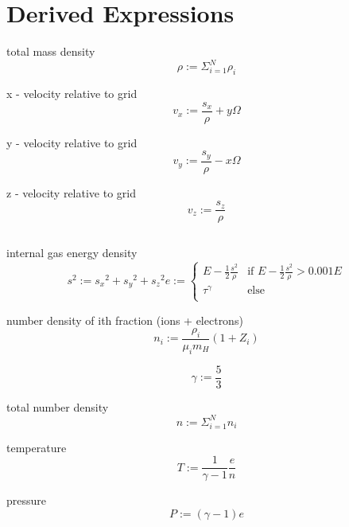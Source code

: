 \documentclass{article}
\begin{document}
\section{Derived Expressions}

total mass density
\begin{equation}
\rho := \Sigma_{i=1}^N \rho_i 
\end{equation}

x - velocity relative to grid
\begin{equation}
v_x  := \frac{s_x}{\rho} + y \Omega 
\end{equation}

y - velocity relative to grid
\begin{equation}
v_y  := \frac{s_y}{\rho} - x \Omega 
\end{equation}

z - velocity relative to grid
\begin{equation}
v_z  := \frac{s_z}{\rho} 
\end{equation}

\begin{equation}
\end{equation}

internal gas energy density
\begin{equation}
s^2  :=  {s_x}^2 + {s_y}^2 + {s_z}^2
e    :=  \begin{cases}
       E - \frac{1}{2} \frac{s^2}{\rho} & \text{if } E - \frac{1}{2} \frac{s^2}{\rho} > 0.001 E \\
       \tau^\gamma & \text{else} \\
     \end{cases} 
\end{equation}

number density of ith fraction (ions + electrons)
\begin{equation}
n_i := \frac{\rho_i}{\mu_i m_H} \left ( 1 + Z_i \right ) 
\end{equation}

\begin{equation}
\gamma := \frac{5}{3}
\end{equation}

total number density
\begin{equation}
n := \Sigma_{i=1}^N  n_i
\end{equation}

temperature
\begin{equation}
T := \frac{1}{\gamma-1} \frac{e}{n}
\end{equation}

pressure
\begin{equation}
P := \left(\gamma-1\right) e
\end{equation}
\end{document}
